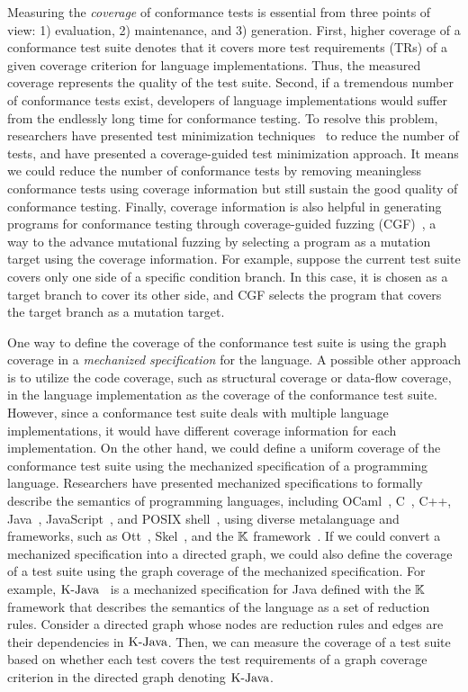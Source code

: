 Measuring the \textit{coverage} of conformance tests is essential from three
points of view: 1) evaluation, 2) maintenance, and 3) generation.
%
First, higher coverage of a conformance test suite denotes that it covers more
test requirements (TRs) of a given coverage criterion for language
implementations.
%
Thus, the measured coverage represents the quality of the test suite.
%
Second, if a tremendous number of conformance tests exist, developers of
language implementations would suffer from the endlessly long time for
conformance testing.
%
To resolve this problem, researchers have presented test minimization
techniques~\cite{test-minimize-survey} to reduce the number of tests, and
\citet{cov-test-minimize} have presented a coverage-guided test minimization
approach.
%
It means we could reduce the number of conformance tests by removing meaningless
conformance tests using coverage information but still sustain the good quality
of conformance testing.
%
Finally, coverage information is also helpful in generating programs for
conformance testing through coverage-guided fuzzing (CGF)~\cite{afl}, a way to
the advance mutational fuzzing by selecting a program as a mutation target using
the coverage information.
%
For example, suppose the current test suite covers only one side of a specific
condition branch.
%
In this case, it is chosen as a target branch to cover its other side, and CGF
selects the program that covers the target branch as a mutation target.


One way to define the coverage of the conformance test suite is using the graph
coverage in a \textit{mechanized specification} for the language.
%
A possible other approach is to utilize the code coverage, such as structural
coverage or data-flow coverage, in the language implementation as the coverage
of the conformance test suite.
%
However, since a conformance test suite deals with multiple language
implementations, it would have different coverage information for each
implementation.
%
On the other hand, we could define a uniform coverage of the conformance test
suite using the mechanized specification of a programming language.
%
Researchers have presented mechanized specifications to formally describe the
semantics of programming languages, including OCaml~\cite{ocaml-light-spec},
C~\cite{c-light-spec}, C++\cite{cpp-spec}, Java~\cite{k-java},
JavaScript~\cite{jiset}, and POSIX shell~\cite{posix-shell-spec}, using diverse
metalanguage and frameworks, such as Ott~\cite{ott}, Skel~\cite{skel}, and the
$\mathbb{K}$ framework~\cite{kframework}.
%
If we could convert a mechanized specification into a directed graph, we could
also define the coverage of a test suite using the graph coverage of the
mechanized specification.
%
For example, $\text{K-Java}$~\cite{k-java} is a mechanized specification for Java
defined with the $\mathbb{K}$ framework that describes the semantics of the
language as a set of reduction rules.
%
Consider a directed graph whose nodes are reduction rules and edges are
their dependencies in $\text{K-Java}$.
%
Then, we can measure the coverage of a test suite based on whether each test
covers the test requirements of a graph coverage criterion in the directed graph
denoting $\text{K-Java}$.

